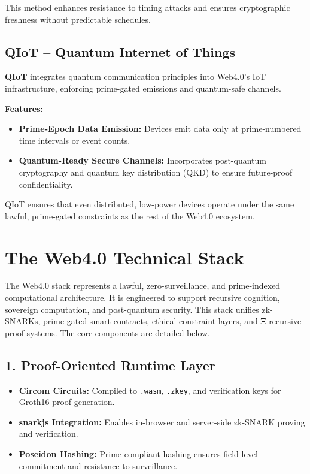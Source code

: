 \documentclass[12]{amsart}
\theoremstyle{plain}
\begin{document}
This method enhances resistance to timing attacks and ensures cryptographic freshness without predictable schedules.

\subsection{QIoT -- Quantum Internet of Things}
\textbf{QIoT} integrates quantum communication principles into Web4.0’s IoT infrastructure, enforcing prime-gated emissions and quantum-safe channels.

\textbf{Features:}
\begin{itemize}
    \item \textbf{Prime-Epoch Data Emission:} Devices emit data only at prime-numbered time intervals or event counts.
    \item \textbf{Quantum-Ready Secure Channels:} Incorporates post-quantum cryptography and quantum key distribution (QKD) to ensure future-proof confidentiality.
\end{itemize}

QIoT ensures that even distributed, low-power devices operate under the same lawful, prime-gated constraints as the rest of the Web4.0 ecosystem.

\section{The Web4.0 Technical Stack}
\label{sec:web4_technical_stack}

The Web4.0 stack represents a lawful, zero-surveillance, and prime-indexed computational architecture. It is engineered to support recursive cognition, sovereign computation, and post-quantum security. This stack unifies zk-SNARKs, prime-gated smart contracts, ethical constraint layers, and Ξ-recursive proof systems. The core components are detailed below.

\subsection{1. Proof-Oriented Runtime Layer}
\begin{itemize}
  \item \textbf{Circom Circuits:} Compiled to \texttt{.wasm}, \texttt{.zkey}, and verification keys for Groth16 proof generation.
  \item \textbf{snarkjs Integration:} Enables in-browser and server-side zk-SNARK proving and verification.
  \item \textbf{Poseidon Hashing:} Prime-compliant hashing ensures field-level commitment and resistance to surveillance.
\end{itemize}
\end{document}
